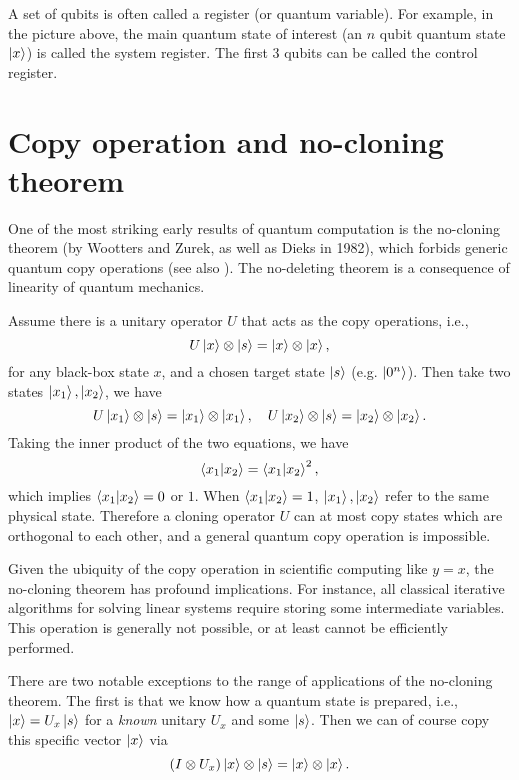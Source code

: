 A set of qubits is often called a register (or quantum variable). 
For example, in the picture above, the main quantum state of interest (an $n$ qubit quantum state $\ket{x}$) is called the system register. The first $3$ qubits can be called the control register.



\section{Copy operation and no-cloning theorem}

One of the most striking early results of quantum computation is the no-cloning theorem (by Wootters and Zurek, as well as Dieks in 1982), which forbids generic quantum copy operations (see also \cite[Section 12.1]{NielsenChuang2000}). The no-deleting theorem is a consequence of linearity of quantum mechanics.

Assume there is a unitary operator $U$ that acts as the copy operations, i.e.,
\begin{equation}
  U\ket{x}\otimes\ket{s}=\ket{x}\otimes\ket{x},
\end{equation}
for any black-box state $x$, and a chosen target state $\ket{s}$ (e.g. $\ket{0^n}$). Then take two states $\ket{x_1},\ket{x_2}$, we have
\begin{equation}
  U\ket{x_1}\otimes\ket{s}=\ket{x_1}\otimes\ket{x_1}, \quad U\ket{x_2}\otimes\ket{s}=\ket{x_2}\otimes\ket{x_2}.
\end{equation}
Taking the inner product of the two equations, we have
\begin{equation}
\braket{x_1|x_2}=\braket{x_1|x_2}^2,
\end{equation}
which implies $\braket{x_1|x_2}=0$ or $1$. When $\braket{x_1|x_2}=1$, $\ket{x_1},\ket{x_2}$ refer to the same physical state.
Therefore a cloning operator $U$ can at most copy states which are orthogonal to each other, and a general quantum copy operation is impossible.

Given the ubiquity of the copy operation in scientific computing like $y=x$, the no-cloning theorem has profound implications. 
For instance, all classical iterative algorithms for solving linear systems require storing some intermediate variables. 
This operation is generally not possible, or at least cannot be efficiently performed.

There are two notable exceptions to the range of applications of the no-cloning theorem. 
The first is that we know how a quantum state is prepared, i.e., $\ket{x}=U_x\ket{s}$ for a \emph{known} unitary $U_x$ and some $\ket{s}$. 
Then we can of course copy this specific vector $\ket{x}$ via 
\begin{equation}
(I\otimes U_x)\ket{x}\otimes\ket{s}=\ket{x}\otimes\ket{x}.
\end{equation}

